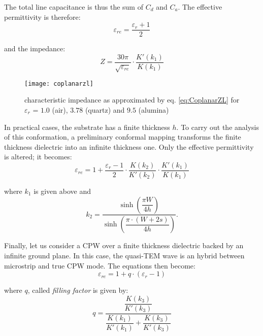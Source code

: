 The total line capacitance is thus the sum of $C_d$ and $C_a$.  The
effective permittivity is therefore:
\begin{equation}
\varepsilon_{re} = \dfrac{\varepsilon_r+1}{2}
\end{equation}

and the impedance:
\begin{equation}
Z=\dfrac{30\pi}{\sqrt{\varepsilon_{re}}}\cdot\dfrac{K'(k_1)}{K(k_1)}
\label{eq:CoplanarZL}
\end{equation}

\begin{figure}[ht]
\begin{center}
\texttt{[image: coplanarzl]}
\end{center}
\caption{characteristic impedance as approximated by eq. \eqref{eq:CoplanarZL} for $\varepsilon_{r}$ = $1.0$ (air), $3.78$ (quartz) and $9.5$ (alumina)}
\label{fig:coplanarzl}
\end{figure}
\FloatBarrier

In practical cases, the substrate has a finite thickness $h$.  To
carry out the analysis of this conformation, a preliminary conformal
mapping transforms the finite thickness dielectric into an infinite
thickness one.  Only the effective permittivity is altered; it
becomes:
\begin{equation}
\varepsilon_{re}=1+\dfrac{\varepsilon_r-1}{2}\cdot\dfrac{K(k_2)}{K'(k_2)}\cdot\dfrac{K'(k_1)}{K(k_1)}
\end{equation}

where $k_1$ is given above and
\begin{equation}
k_2=\dfrac{\sinh\left(\dfrac{\pi W}{4h}\right)}{\sinh\left(\dfrac{\pi\cdot\left(W+2s\right)}{4h}\right)}.
\end{equation}

Finally, let us consider a CPW over a finite thickness dielectric
backed by an infinite ground plane.  In this case, the quasi-TEM wave
is an hybrid between microstrip and true CPW mode.  The equations then
become:
\begin{equation}
\varepsilon_{re} =1 + q\cdot\left(\varepsilon_r - 1\right)
\end{equation}

where $q$, called \emph{filling factor} is given by:
\begin{equation}
q = \dfrac{\dfrac{K(k_3)}{K'(k_3)}}{\dfrac{K(k_1)}{K'(k_1)}+\dfrac{K(k_3)}{K'(k_3)}}
\end{equation}

